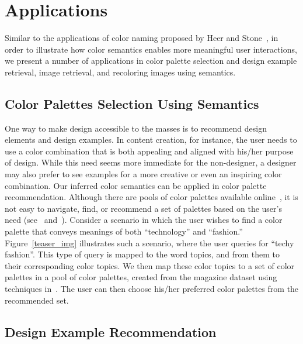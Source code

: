 \documentclass[prodmode,acmtochi]{acmsmall}
\begin{document}
\section{Applications}
\label{sec:Applications}

Similar to the applications of color naming proposed by Heer and Stone~\cite{heer2012color},
in order to illustrate how color semantics enables more meaningful user interactions, we present a number of applications in color palette selection and design example retrieval, image retrieval, and recoloring images using semantics.

\subsection{Color Palettes Selection Using Semantics}

One way to make design accessible to the masses is to recommend design
elements and design examples.  In content creation, for instance, the
user needs to use a color combination that is both appealing and aligned
with his/her purpose of design.  While this need seems more immediate for the non-designer, a designer may also prefer to see examples for a
more creative or even an inspiring color combination.  Our inferred
color semantics can be applied in color palette recommendation.
Although there are pools of color palettes available
online~\cite{AdobeKuler,colourlovers}, it is not easy to navigate, find,
or recommend a set of palettes based on the user's need (see~\cite{o2011color} and~\cite{O'Donovan:2014:CFC:2630099.2630100}).
Consider a scenario in which the user wishes to find a color palette that conveys meanings of both ``technology'' and ``fashion.''
Figure~\ref{teaser_img} illustrates such a scenario, where the user queries for ``techy fashion''. This type of query is mapped to the word topics, and from them to their corresponding color topics. We then map these color topics to a set of color palettes in a pool of color palettes, created from the magazine dataset using techniques in~\cite{2013-color-themes}. The user can then choose his/her preferred color palettes from the recommended set.

\subsection{Design Example Recommendation}
\end{document}
